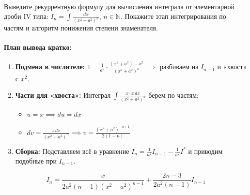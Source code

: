 {Выведите рекуррентную формулу для вычисления интеграла от элементарной дроби IV типа: $I_{n}=\int\frac{dx}{(x^{2}+a^{2})^{n}}$, $n\in\mathbb{N}$. Покажите этап интегрирования по частям и алгоритм понижения степени знаменателя.}

\paragraph{План вывода кратко:}
\begin{enumerate}
    \item \textbf{Подмена в числителе:} $1 = \frac{1}{a^2} \cdot \frac{(x^2+a^2) - x^2}{(x^2+a^2)^n} \implies$ разбиваем на $I_{n-1}$ и «хвост» с $x^2$.
    \item \textbf{Части для «хвоста»:} Интеграл $\int \frac{x \cdot x \, dx}{(x^2+a^2)^n}$ берем по частям:
    \begin{itemize}
        \item $u = x \implies du = dx$
        \item $dv = \frac{x \, dx}{(x^2+a^2)^n} \implies v = \frac{(x^2+a^2)^{-n+1}}{2(1-n)}$
    \end{itemize}
    \item \textbf{Сборка:} Подставляем всё в уравнение $I_n = \frac{1}{a^2}I_{n-1} - \frac{1}{a^2}I^*$ и приводим подобные при $I_{n-1}$.
\end{enumerate}

\begin{tcolorbox}[colback=white, colframe=black, boxrule=0.5pt, arc=0pt, borderline={0.5pt}{0pt}{black, dashed}]
    \centering
    $$ I_n = \frac{x}{2a^2(n-1)(x^2+a^2)^{n-1}} + \frac{2n-3}{2a^2(n-1)} I_{n-1} $$
\end{tcolorbox}
